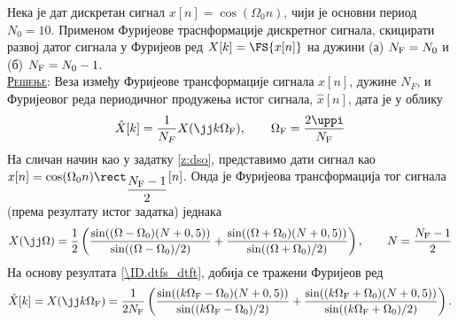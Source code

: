 \PID 
Нека је дат дискретан сигнал $x[n] = \cos(\Omega_0 n)$, чији је основни период $N_0 = 10$. Применом 
Фуријеове траснформације дискретног сигнала, скицирати развој датог сигнала у Фуријеов ред 
$X[k] = \FS{x[n]}$ на дужини (а) $N_{\rm F} = N_0$ и (б) $N_{\rm F} = N_0 - 1$. \\

\textsc{\underline{Решење}:} Веза између Фуријеове трансформације сигнала $x[n]$, дужине $N_F$, и Фуријеовог реда 
периодичног продужења истог сигнала, $\hat x[n]$, дата је у облику 
\begin{equation}
    \hat X[k] = \dfrac{1}{N_F} X(\jj k \Omega_{\rm F}), \qquad \Omega_{\rm F} = \dfrac{2\uppi}{N_{\rm F}} \label{\ID.dtfs_dtft}
\end{equation}
На сличан начин као у задатку \ref{z:dso}, представимо дати сигнал као $x[n] = \cos(\Omega_0 n) \rect_{\dfrac{N_{\rm F}-1}2}[n]$.
Онда је Фуријеова трансформација тог сигнала (према резултату истог задатка) једнака
\begin{equation}
    X(\jj\Omega)
    =
    \dfrac{1}{2} \left(
    \dfrac{\sin( (\Omega - \Omega_0)(N + 0,5) ) }{ \sin((\Omega - \Omega_0)/2) }
    +
    \dfrac{\sin( (\Omega + \Omega_0)(N + 0,5) ) }{ \sin((\Omega + \Omega_0)/2) }  \right), \qquad N = \dfrac{N_{\rm F}-1}{2}
\end{equation}
На основу резултата \ref{\ID.dtfs_dtft}, добија се тражени Фуријеов ред 
\begin{equation}
    \hat X[k] = 
    X(\jj k \Omega_{\rm F} )
    =
    \dfrac{1}{2N_{\rm F}}
    \left(
    \dfrac{\sin( (k \Omega_{\rm F} - \Omega_0)(N + 0,5) ) }{ \sin((k \Omega_{\rm F} - \Omega_0)/2) }
    +
    \dfrac{\sin( (k \Omega_{\rm F} + \Omega_0)(N + 0,5) ) }{ \sin((k \Omega_{\rm F} + \Omega_0)/2) }
    \right).
\end{equation}

